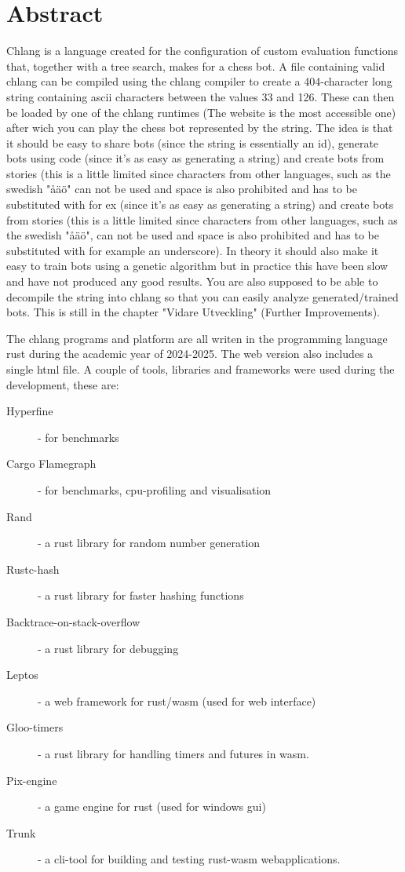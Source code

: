 \documentclass{article}
\begin{document}
	
	\section{Abstract}
	Chlang is a language created for the configuration of custom evaluation functions that, together with a tree search, makes for a chess bot. A file containing valid chlang can be compiled using the chlang compiler to create a 404-character long string containing ascii characters between the values 33 and 126. These can then be loaded by one of the chlang runtimes (The website is the most accessible one) after wich you can play the chess bot represented by the string. The idea is that it should be easy to share bots (since the string is essentially an id), generate bots using code (since it's as easy as generating a string) and create bots from stories (this is a little limited since characters from other languages, such as the swedish "åäö" can not be used and space is also prohibited and has to be substituted with for ex (since it's as easy as generating a string) and create bots from stories (this is a little limited since characters from other languages, such as the swedish "åäö", can not be used and space is also prohibited and has to be substituted with for example an underscore). In theory it should also make it easy to train bots using a genetic algorithm but in practice this have been slow and have not produced any good results. You are also supposed to be able to decompile the string into chlang so that you can easily analyze generated/trained bots. This is still in the chapter "Vidare Utveckling" (Further Improvements).

	The chlang programs and platform are all writen in the programming language rust during the academic year of 2024-2025. The web version also includes a single html file. A couple of tools, libraries and frameworks were used during the development, these are:
	\begin{description}
	\item [Hyperfine] - for benchmarks
	\item [Cargo Flamegraph] - for benchmarks, cpu-profiling and visualisation
	\item [Rand] - a rust library for random number generation
	\item [Rustc-hash] - a rust library for faster hashing functions
	\item [Backtrace-on-stack-overflow] - a rust library for debugging
	\item [Leptos] - a web framework for rust/wasm (used for web interface)
	\item [Gloo-timers] - a rust library for handling timers and futures in wasm.
	\item [Pix-engine] - a game engine for rust (used for windows gui)
    \item [Trunk] - a cli-tool for building and testing rust-wasm webapplications.
	\end{description}
	
\end{document}
